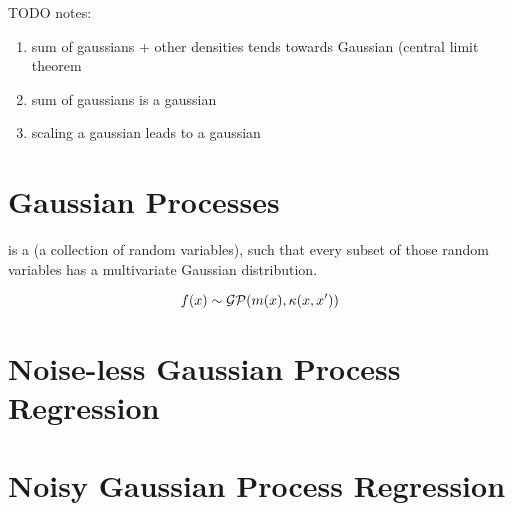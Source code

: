 \citep{eisenberg2008sum} \citep{mitzenmacher2017probability}

TODO notes:

\begin{enumerate}
\item sum of gaussians + other densities tends towards Gaussian (central limit theorem\
\item sum of gaussians is a gaussian
\item scaling a gaussian leads to a gaussian
\end{enumerate}

\section{Gaussian Processes}

 is a  (a collection of random variables), such that every subset of those random variables has a multivariate Gaussian distribution.

\begin{equation}
f(x) \sim {\mathcal{G}} {\mathcal{P}} (m(x), \kappa(x, x'))
\end{equation} 


\section{Noise-less Gaussian Process Regression}

\section{Noisy Gaussian Process Regression}
